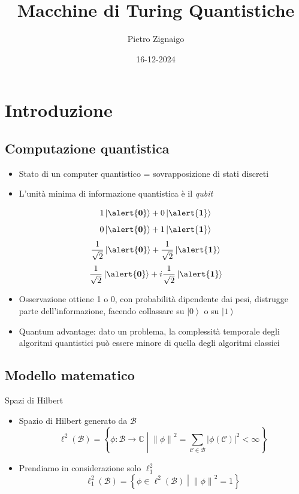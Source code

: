 \documentclass{beamer}
\title
{Macchine di Turing Quantistiche}
\author
{Pietro Zignaigo}
\institute
{Università di Genova}
\date
{16-12-2024}
\newcommand{\spacedmiddle}[1]{\mathrel{}\middle#1\mathrel{}}
\newcommand{\ket}[1]{\left | #1 \right \rangle}
\newcommand{\hil}{\ell^{2}}
\newcommand{\hiluninorm}{\hil_{1}}
\newcommand{\Zero}{\alert{\mathbf{0}}}
\newcommand{\One}{\alert{\mathbf{1}}}
\begin{document}
\begin{frame}
	\titlepage
\end{frame}

\begin{frame}
	\tableofcontents
\end{frame}

\section{Introduzione}

\subsection{Computazione quantistica}

\begin{frame}{\subsecname}{}
	\begin{itemize}
		\item Stato di un computer quantistico = sovrapposizione di stati discreti
		\pause \item L'unità minima di informazione quantistica è il \textit{qubit}
	\end{itemize}
	\[ 1 \ket{\Zero} + 0 \ket{\One} \]
	\[ 0 \ket{\Zero} +  1 \ket{\One} \]
	\[ \frac{1}{\sqrt{2}} \ket{\Zero} + \frac{1}{\sqrt{2}} \ket{\One} \]
	\[ \frac{1}{\sqrt{2}} \ket{\Zero} + i \frac{1}{\sqrt{2}} \ket{\One} \]
\end{frame}

\begin{frame}{\subsecname}{}
	\begin{itemize}
		\item Osservazione ottiene 1 o 0, con probabilità dipendente dai pesi, distrugge parte dell'informazione, facendo collassare su \( \ket{0} \) o su \( \ket{1} \)
		\item Quantum advantage: dato un problema, la complessità temporale degli algoritmi quantistici può essere minore di quella degli algoritmi classici
	\end{itemize}
\end{frame}

\subsection{Modello matematico}

\begin{frame}{\subsecname}{Spazi di Hilbert}
	\begin{itemize}
		\item \alert{Spazio di Hilbert} generato da \( \mathcal{B} \)
		\[ \hil \left ( \mathcal{B} \right ) = \left \{ \phi : \mathcal{B} \rightarrow \mathbb{C} \spacedmiddle | \left \| \phi \right \|^{2} = \sum_{\mathcal{C} \in \mathcal{B}} \left | \phi \left ( \mathcal{C} \right ) \right |^{2} < \infty \right \}\]
		\item Prendiamo in considerazione solo \(\hiluninorm\)
		\[ \hiluninorm \left ( \mathcal{B} \right ) = \left \{ \phi \in \hil \left ( \mathcal{B} \right ) \spacedmiddle | \left \| \phi \right \|^{2} = 1 \right \}\]
	\end{itemize}
\end{frame}
\end{document}
